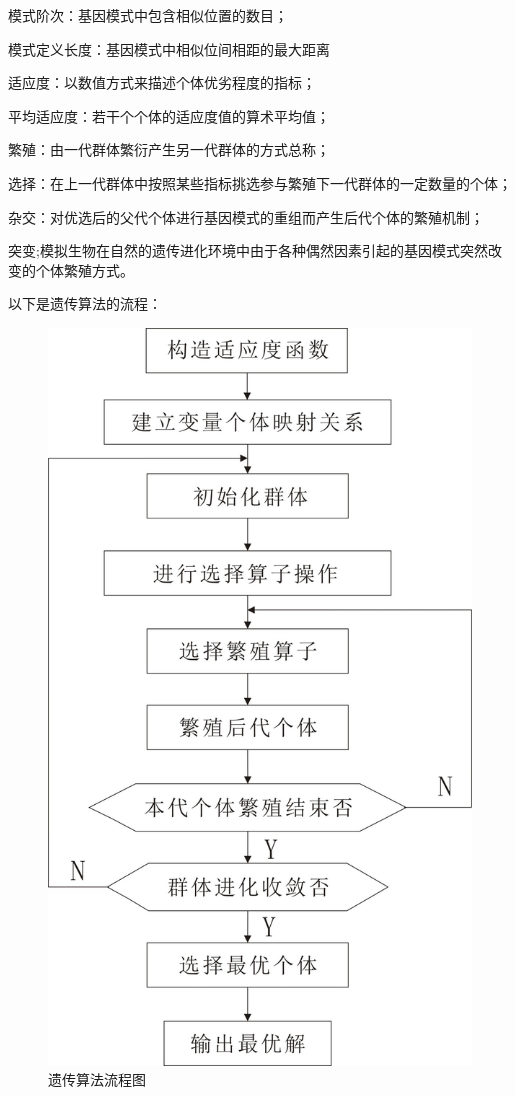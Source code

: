\documentclass{article}
\begin{document}
模式阶次：基因模式中包含相似位置的数目；

模式定义长度：基因模式中相似位间相距的最大距离

适应度：以数值方式来描述个体优劣程度的指标；

平均适应度：若干个个体的适应度值的算术平均值；

繁殖：由一代群体繁衍产生另一代群体的方式总称；

选择：在上一代群体中按照某些指标挑选参与繁殖下一代群体的一定数量的个体；

杂交：对优选后的父代个体进行基因模式的重组而产生后代个体的繁殖机制；

突变;模拟生物在自然的遗传进化环境中由于各种偶然因素引起的基因模式突然改变的个体繁殖方式\cite{ref3}。

以下是遗传算法的流程：

\begin{figure}[H]%
    \centering
    \includegraphics[scale=0.6]{2.jpg}%
    \caption{遗传算法流程图}
\end{figure}
\end{document}
